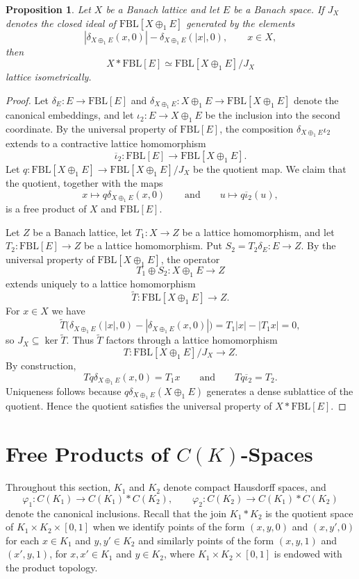 \documentclass[12pt]{amsart}
\newcommand{\FBL}{\mathrm{FBL}}
\theoremstyle{plain}
\newtheorem{proposition}[theorem]{Proposition}
\theoremstyle{definition}
\begin{document}
\begin{proposition}
Let $X$ be a Banach lattice and let $E$ be a Banach space. If $J_X$ denotes the closed ideal of $\FBL[X\oplus_1 E]$ generated by the elements
\[
|\delta_{X\oplus_1 E}(x,0)|-\delta_{X\oplus_1 E}(|x|,0),
\qquad x\in X,
\]
then
\[
X\ast \FBL[E]\simeq \FBL[X\oplus_1 E]/J_X
\]
lattice isometrically.
\end{proposition} 

\begin{proof}
Let $\delta_E:E\to \FBL[E]$ and $\delta_{X\oplus_1 E}:X\oplus_1 E\to \FBL[X\oplus_1 E]$ denote the canonical embeddings, and let $\iota_2:E\to X\oplus_1 E$ be the inclusion into the second coordinate. By the universal property of $\FBL[E]$, the composition $\delta_{X\oplus_1 E}\iota_2$ extends to a contractive lattice homomorphism
\[
\overline{\iota}_2:\FBL[E]\to \FBL[X\oplus_1 E].
\]
Let $q:\FBL[X\oplus_1 E]\to \FBL[X\oplus_1 E]/J_X$ be the quotient map. We claim that the quotient, together with the maps
\[
x\mapsto q\delta_{X\oplus_1 E}(x,0)
\qquad\text{and}\qquad
u\mapsto q\overline{\iota}_2(u),
\]
is a free product of $X$ and $\FBL[E]$.

Let $Z$ be a Banach lattice, let $T_1:X\to Z$ be a lattice homomorphism, and let $T_2:\FBL[E]\to Z$ be a lattice homomorphism. Put $S_2=T_2\delta_E:E\to Z$. By the universal property of $\FBL[X\oplus_1 E]$, the operator
\[
T_1\oplus S_2:X\oplus_1 E\to Z
\]
extends uniquely to a lattice homomorphism
\[
\widetilde{T}:\FBL[X\oplus_1 E]\to Z.
\]
For $x\in X$ we have
\[
\widetilde{T}\bigl(\delta_{X\oplus_1 E}(|x|,0)-|\delta_{X\oplus_1 E}(x,0)|\bigr)
=
T_1|x|-|T_1x|=0,
\]
so $J_X\subseteq \ker \widetilde{T}$. Thus $\widetilde{T}$ factors through a lattice homomorphism
\[
T:\FBL[X\oplus_1 E]/J_X\to Z.
\]
By construction,
\[
Tq\delta_{X\oplus_1 E}(x,0)=T_1x
\qquad\text{and}\qquad
Tq\overline{\iota}_2=T_2.
\]
Uniqueness follows because $q\delta_{X\oplus_1 E}(X\oplus_1 E)$ generates a dense sublattice of the quotient. Hence the quotient satisfies the universal property of $X\ast \FBL[E]$.
\end{proof}

\section{Free Products of $C(K)$-Spaces}\label{sec:C(K)}

Throughout this section, $K_1$ and $K_2$ denote compact Hausdorff spaces, and
\[
\varphi_1:C(K_1)\to C(K_1)\ast C(K_2),
\qquad
\varphi_2:C(K_2)\to C(K_1)\ast C(K_2)
\]
denote the canonical inclusions. Recall that the join $ K_1* K_2$ is the quotient space of $ K_1\times K_2\times [0,1]$ when we identify points of the form $(x,y,0)$ and $(x,y',0)$ for each $x\in K_1$ and $y,y'\in K_2$ and similarly points of the form $(x,y,1)$ and $(x',y,1)$, for $x,x'\in K_1$ and $y\in K_2$, where $ K_1 \times K_2\times [0,1]$ is endowed with the product topology.
\end{document}
